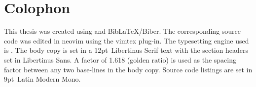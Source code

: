 
\chapter{Colophon}

This thesis was created using \LaTeXe{} and Bib\LaTeX{}/Biber. The corresponding
source code was edited in neovim using the vimtex plug-in. The typesetting
engine used is . The body copy
is set in a 12pt~Libertinus Serif text with the section headers set in
Libertinus Sans. A factor of 1.618 (golden ratio) is used as the spacing factor
between any two base-lines in the body copy. Source code listings are set in
9pt~Latin Modern Mono.
